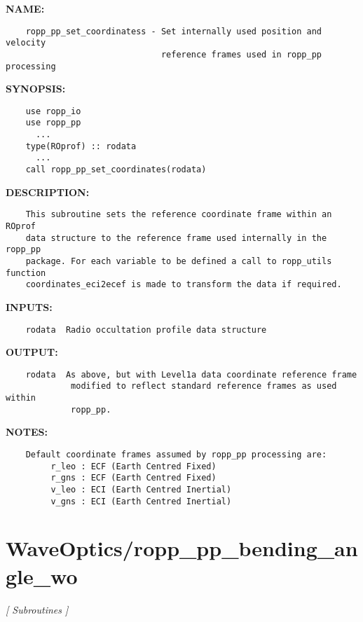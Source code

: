 \label{ch:robo8}
\label{ch:Coordinates_ropp_pp_set_coordinates}
\textbf{NAME:}\hspace{0.08in}\begin{Verbatim}
    ropp_pp_set_coordinatess - Set internally used position and velocity 
                               reference frames used in ropp_pp processing
\end{Verbatim}
\textbf{SYNOPSIS:}\hspace{0.08in}\begin{Verbatim}
    use ropp_io
    use ropp_pp
      ...
    type(ROprof) :: rodata
      ...
    call ropp_pp_set_coordinates(rodata)
\end{Verbatim}
\textbf{DESCRIPTION:}\hspace{0.08in}\begin{Verbatim}
    This subroutine sets the reference coordinate frame within an ROprof
    data structure to the reference frame used internally in the ropp_pp 
    package. For each variable to be defined a call to ropp_utils function
    coordinates_eci2ecef is made to transform the data if required. 
\end{Verbatim}
\textbf{INPUTS:}\hspace{0.08in}\begin{Verbatim}
    rodata  Radio occultation profile data structure
\end{Verbatim}
\textbf{OUTPUT:}\hspace{0.08in}\begin{Verbatim}
    rodata  As above, but with Level1a data coordinate reference frame 
             modified to reflect standard reference frames as used within 
             ropp_pp.
\end{Verbatim}
\textbf{NOTES:}\hspace{0.08in}\begin{Verbatim}
    Default coordinate frames assumed by ropp_pp processing are:
         r_leo : ECF (Earth Centred Fixed)
         r_gns : ECF (Earth Centred Fixed)
         v_leo : ECI (Earth Centred Inertial)
         v_gns : ECI (Earth Centred Inertial)
\end{Verbatim}
\section{WaveOptics/ropp\_pp\_bending\_angle\_wo}
\textsl{[ Subroutines ]}

